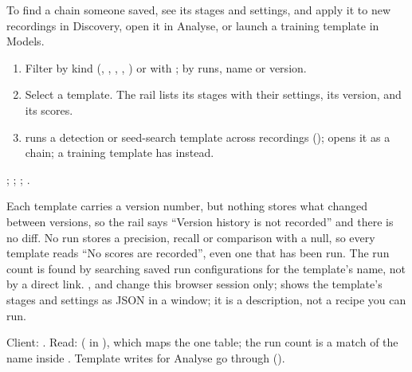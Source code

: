 To find a chain someone saved, see its stages and settings, and apply it to new recordings
in Discovery, open it in Analyse, or launch a training template in Models.


\begin{enumerate}
  \item Filter by kind (, , , ,
    ) or with ;  by runs, name or
    version.
  \item Select a template. The rail lists its stages with their settings, its version, and its
    scores.
  \item {} runs a detection or seed-search template across recordings
    ();  opens it as a chain; a training template
    has  instead.
\end{enumerate}

; ; ;
.

\begin{watchout}
Each template carries a version number, but nothing stores what changed between versions, so
the rail says ``Version history is not recorded'' and there is no diff. No run stores a
precision, recall or comparison with a null, so every template reads ``No scores are
recorded'', even one that has been run. The run count is found by searching saved run
configurations for the template's name, not by a direct link. , 
and  change this browser session only;  shows the template's stages
and settings as JSON in a window; it is a description, not a recipe you can run.
\end{watchout}

\begin{underthehood}[Templates]
Client: . Read:  ( in ), which maps
the one  table; the run count is a  match of the name inside
. Template writes for Analyse go through 
().
\end{underthehood}
